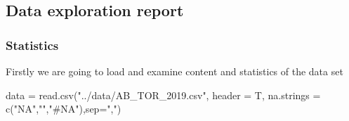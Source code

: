 \hypertarget{data-exploration-report}{%
\subsection{Data exploration report}\label{data-exploration-report}}

\hypertarget{statistics}{%
\subsubsection{Statistics}\label{statistics}}

Firstly we are going to load and examine content and statistics of the
data set

\begin{Schunk}
\begin{Sinput}
data = read.csv("../data/AB_TOR_2019.csv", header = T, 
                na.strings = c("NA","","#NA"),sep=",")
\end{Sinput}
\end{Schunk}

